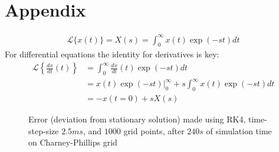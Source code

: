 \chapter{Appendix}
\begin{align*}
\mathcal{L}\{x(t)\}=X(s)=\int_0^\infty x(t)\exp (-st)dt
\end{align*}
For differential equations the identity for derivatives is key:
\begin{align*}
\mathcal{L} \left\{ \frac{dx}{dt}(t) \right\} &=\int_0^\infty \frac{dx}{dt}(t)\exp (-st)dt\\
&=x(t)\exp(-st)\rvert _0^\infty + s  \int_0^\infty x(t)\exp (-st)dt\\
&=-x(t=0) + sX(s)
\end{align*}





\begin{figure}[!h]
    \caption{Error (deviation from stationary solution) made using RK4, time-step-size $2.5ms$, and $1000$ grid points, after $240s$ of simulation time on Charney-Phillips grid}
    \label{fig:cp_stat_err}
\end{figure}